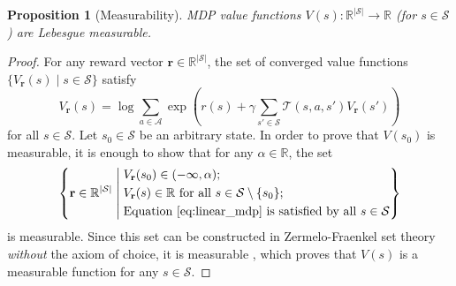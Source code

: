 \documentclass{mpaper}
\newtheorem{proposition}[theorem]{Proposition}
\newcommand{\V}{V_{\mathbf{r}}}
\begin{document}
\begin{proposition}[Measurability] \label{thm:measurability}
  MDP value functions $V(s) : \mathbb{R}^{|\mathcal{S}|} \to \mathbb{R}$ (for $s
  \in \mathcal{S}$) are Lebesgue measurable.
\end{proposition}
\begin{proof}
  For any reward vector $\mathbf{r} \in \mathbb{R}^{|\mathcal{S}|}$, the
  set of converged value functions $\{ \V(s) \mid s \in
  \mathcal{S} \}$ satisfy
  \begin{equation} \label{eq:linear_mdp}
    \V(s) = \log \sum_{a \in \mathcal{A}}
    \exp\left( r(s) + \gamma\sum_{s' \in \mathcal{S}} \mathcal{T}(s, a,
      s')\V(s') \right)
  \end{equation}
  for all $s \in \mathcal{S}$. Let $s_0 \in \mathcal{S}$ be an arbitrary state.
  In order to prove that $V(s_0)$ is measurable, it is enough to show that for
  any $\alpha \in \mathbb{R}$, the set
  \[
    \left\{ \mathbf{r} \in \mathbb{R}^{|\mathcal{S}|} \; \middle|
    \begin{aligned}
      \;&\V(s_0) \in (-\infty, \alpha); \\
      \;&\V(s) \in \mathbb{R} \text{ for all } s \in \mathcal{S} \setminus \{ s_0 \}; \\
      \;&\text{Equation~\eqref{eq:linear_mdp} is satisfied by all } s \in
      \mathcal{S}
    \end{aligned}
    \right\}
  \]
  is measurable. Since this set can be constructed in Zermelo-Fraenkel set
  theory \emph{without} the axiom of choice, it is measurable
  \cite{herrlich2006axiom}, which proves that $V(s)$ is a measurable function
  for any $s \in \mathcal{S}$.
\end{proof}
\end{document}
